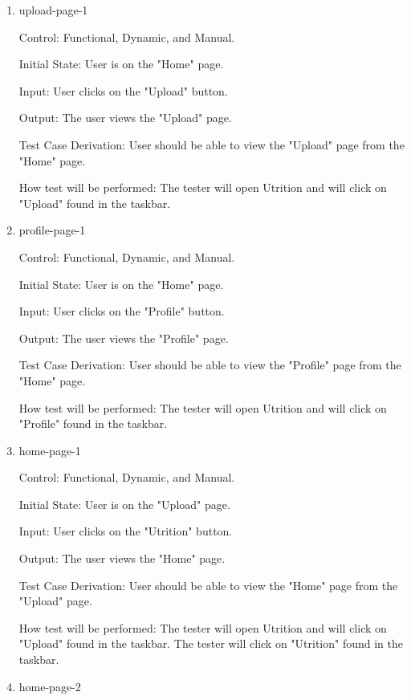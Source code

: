\documentclass[12pt, titlepage]{article}
\begin{document}
	\begin{enumerate}
		\item{upload-page-1\\}
		
		Control: Functional, Dynamic, and Manual.
		
		Initial State: User is on the "Home" page.
		
		Input: User clicks on the "Upload" button.
		
		Output: The user views the "Upload" page.
		
		Test Case Derivation: User should be able to view the "Upload" page from the "Home" page.
		
		How test will be performed: The tester will open Utrition and will click on "Upload" found in the taskbar.
		
		\item{profile-page-1\\}
		
		Control: Functional, Dynamic, and Manual.
		
		Initial State: User is on the "Home" page.
		
		Input: User clicks on the "Profile" button.
		
		Output: The user views the "Profile" page.
		
		Test Case Derivation: User should be able to view the "Profile" page from the "Home" page.
		
		How test will be performed: The tester will open Utrition and will click on "Profile" found in the taskbar.
		
		\item{home-page-1\\}
		
		Control: Functional, Dynamic, and Manual.
		
		Initial State: User is on the "Upload" page.
		
		Input: User clicks on the "Utrition" button.
		
		Output: The user views the "Home" page.
		
		Test Case Derivation: User should be able to view the "Home" page from the "Upload" page.
		
		How test will be performed: The tester will open Utrition and will click on "Upload" found in the taskbar. The tester will click on "Utrition" found in the taskbar.
		
		\item{home-page-2\\}
		

\end{enumerate}
\end{document}
